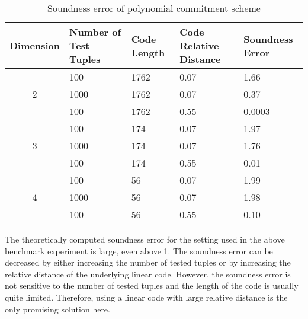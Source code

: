 \begin{table}[h!]
\centering
\begin{tabular}{| c | m{5em} | m{5em} | m{5em}  | m{5em}|} 
 \hline
 Dimension & Number of Test Tuples & Code Length & Code Relative Distance & Soundness Error \\ [0.5ex] 
 \hline\hline
 
 \multirow{3}{*}{2} & 100 & 1762 & 0.07 & 1.66  \\
  & 1000 & 1762 & 0.07 & 0.37  \\
  & 100 & 1762 & 0.55 & 0.0003  \\
 \hline
 
 \multirow{3}{*}{3} & 100 & 174  & 0.07 & 1.97 \\
 & 1000 & 174  & 0.07 & 1.76 \\
 & 100 & 174  & 0.55 & 0.01 \\
 \hline
 
 \multirow{3}{*}{4} & 100 & 56   & 0.07 & 1.99  \\
  & 1000 & 56   & 0.07 & 1.98  \\
  & 100 & 56   & 0.55 & 0.10  \\ 
 \hline
\end{tabular}
\caption{Soundness error of polynomial commitment scheme}
\label{table:benchmark-pc-3}
\end{table}

The theoretically computed soundness error for the setting used in the above benchmark experiment is large, even above 1. The soundness error can be decreased by either increasing the number of tested tuples or by increasing the relative distance of the underlying linear code. However, the soundness error is not sensitive to the number of tested tuples and the length of the code is usually quite limited. Therefore, using a linear code with large relative distance is the only promising solution here.
